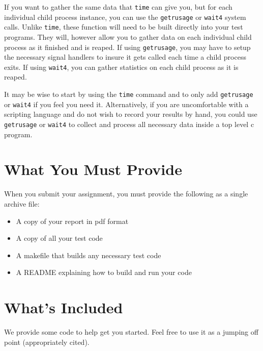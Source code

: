 \documentclass[12pt]{article}
\begin{document}
If you want to gather the same data that \texttt{time} can give you,
but for each individual child process instance, you can use the
\texttt{getrusage} or \texttt{wait4} system calls. Unlike
\texttt{time}, these function will need to be built
directly into your test programs. They will, however allow you to
gather data on each individual child process as it finished and is
reaped. If using \texttt{getrusage}, you may have to setup
the necessary signal handlers to insure it gets
called each time a child process exits. If using \texttt{wait4}, you
can gather statistics on each child process as it is reaped.

It may be wise to start by
using the \texttt{time} command and to only add \texttt{getrusage} or
\texttt{wait4} if you feel you need it. Alternatively, if you are
uncomfortable with a scripting language and do not wish to record your
results by hand, you could use \texttt{getrusage} or \texttt{wait4} to
collect and process all necessary data inside a top level c program.

\section{What You Must Provide}

When you submit your assignment, you must provide the following as a
single archive file:
\begin{itemize}
\item A copy of your report in pdf format
\item A copy of all your test code
\item A makefile that builds any necessary test code
\item A README explaining how to build and run your code
\end{itemize}

\section{What's Included}

We provide some code to help get you started. Feel free to use it as a
jumping off point (appropriately cited).
\end{document}
